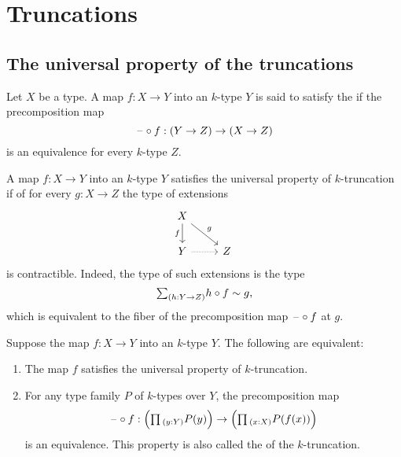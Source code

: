 \section{Truncations}

\subsection{The universal property of the truncations}

\begin{defn}\label{defn:is_truncation}
Let $X$ be a type. A map $f:X\to Y$ into an $k$-type $Y$ is said to satisfy the  if the precomposition map
\begin{equation*}
\mathord{\hspace{1pt}\text{--}\hspace{1pt}}\circ f: (Y\to Z)\to (X\to Z)
\end{equation*}
is an equivalence for every $k$-type $Z$.
\end{defn}

\begin{rmk}
A map $f:X\to Y$ into an $k$-type $Y$ satisfies the universal property of $k$-truncation if of for every $g:X\to Z$ the type of extensions
\begin{equation*}
\begin{tikzcd}
X \arrow[dr,"g"] \arrow[d,swap,"f"] \\
Y \arrow[r,densely dotted] & Z
\end{tikzcd}
\end{equation*}
is contractible. Indeed, the type of such extensions is the type
\begin{equation*}
\sm{h:Y\to Z} h\circ f\htpy g,
\end{equation*}
which is equivalent to the fiber of the precomposition map $\mathord{\hspace{1pt}\text{--}\hspace{1pt}}\circ f$ at $g$. 
\end{rmk}

\begin{thm}\label{thm:trunc_dup}
Suppose the map $f:X\to Y$ into an $k$-type $Y$. The following are equivalent:
\begin{enumerate}
\item The map $f$ satisfies the universal property of $k$-truncation.
\item For any type family $P$ of $k$-types over $Y$, the precomposition map
\begin{equation*}
\blank\circ f : \Big(\prd{y:Y}P(y)\Big)\to \Big(\prd{x:X}P(f(x))\Big)
\end{equation*}
is an equivalence. This property is also called the  of the $k$-truncation.
\end{enumerate}
\end{thm}

